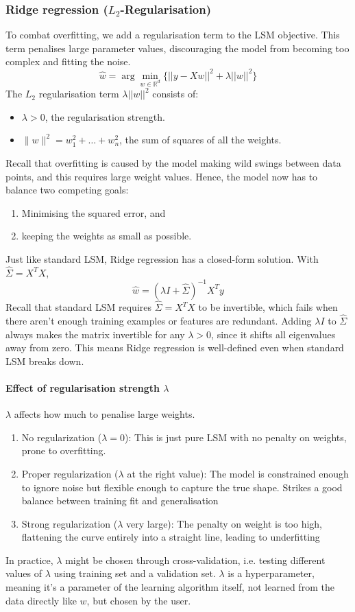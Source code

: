 \documentclass[../Probability.tex]{subfiles}
\begin{document}
\subsubsection{Ridge regression ($L_2$-Regularisation)}
To combat overfitting, we add a regularisation term to the LSM objective. This term penalises large parameter values, discouraging the model from becoming too complex and fitting the noise.
$$\hat{w} = \arg \min_{w \in \mathbb{R}^d} \{||y - Xw||^2 + \lambda||w||^2\}$$
The $L_2$ regularisation term $\lambda||w||^2$ consists of:
\begin{itemize}
    \item $\lambda > 0$, the regularisation strength.
    \item $\|w\|^2 = w_1^2 + \ldots + w_n^2$, the sum of squares of all the weights.
\end{itemize}
Recall that overfitting is caused by the model making wild swings between data points, and this requires large weight values.\newline
Hence, the model now has to balance two competing goals:
\begin{enumerate}
    \item Minimising the squared error, and
    \item keeping the weights as small as possible.
\end{enumerate}
Just like standard LSM, Ridge regression has a closed-form solution.\newline
With $\hat{\Sigma} = X^T X$,
$$\hat{w} = (\lambda I + \hat{\Sigma})^{-1} X^T y$$
Recall that standard LSM requires $\hat{\Sigma} = X^T X$ to be invertible, which fails when there aren't enough training examples or features are redundant.
Adding $\lambda I$ to $\hat{\Sigma}$ always makes the matrix invertible for any $\lambda > 0$, since it shifts all eigenvalues away from zero.
This means Ridge regression is well-defined even when standard LSM breaks down.
\paragraph{Effect of regularisation strength $\lambda$} $\lambda$ affects how much to penalise large weights.
\begin{enumerate}
    \item No regularization ($\lambda = 0$): This is just pure LSM with no penalty on weights, prone to overfitting.
    \item Proper regularization ($\lambda$ at the right value): The model is constrained enough to ignore noise but flexible enough to capture the true shape. Strikes a good balance between training fit and generalisation
    \item Strong regularization ($\lambda$ very large): The penalty on weight is too high, flattening the curve entirely into a straight line, leading to underfitting
\end{enumerate}
In practice, $\lambda$ might be chosen through cross-validation, i.e. testing different values of $\lambda$ using training set and a validation set.
$\lambda$ is a hyperparameter, meaning it's a parameter of the learning algorithm itself, not learned from the data directly like $w$, but chosen by the user.
\end{document}
